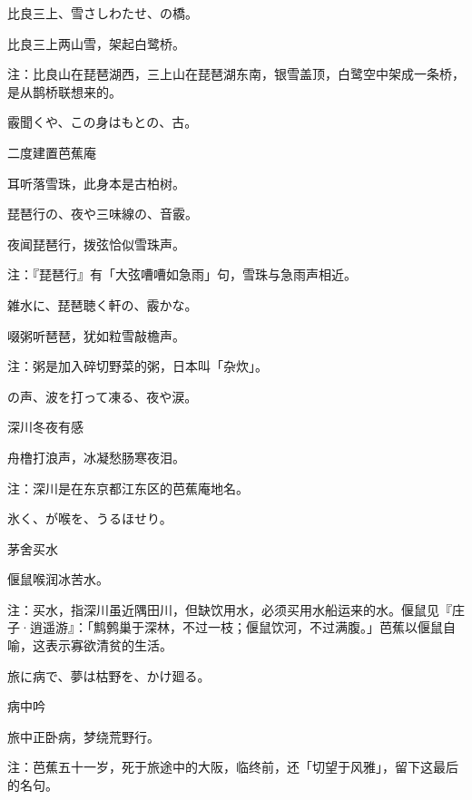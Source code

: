 \begin{haiku}
    {\FH 比良三上、雪さしわたせ、の橋。}

    {\FK 比良三上两山雪，架起白鹭桥。}

    {\FT 注：比良山在琵琶湖西，三上山在琵琶湖东南，银雪盖顶，白鹭空中架成一条桥，是从鹊桥联想来的。}
\end{haiku}

\begin{haiku}
    {\FH 霰聞くや、この身はもとの、古。}

    {\FK 二度建置芭蕉庵}

    {\FK 耳听落雪珠，此身本是古柏树。}
\end{haiku}

\begin{haiku}
    {\FH 琵琶行の、夜や三味線の、音霰。}

    {\FK 夜闻琵琶行，拨弦恰似雪珠声。}

    {\FT 注：『琵琶行』有「大弦嘈嘈如急雨」句，雪珠与急雨声相近。}
\end{haiku}

\begin{haiku}
    {\FH 雑水に、琵琶聴く軒の、霰かな。}

    {\FK 啜粥听琶琶，犹如粒雪敲檐声。}

    {\FT 注：粥是加入碎切野菜的粥，日本叫「杂炊」。}
\end{haiku}

\begin{haiku}
    {\FH {}の声、波を打って凍る、夜や涙。}

    {\FK 深川冬夜有感}

    {\FK 舟橹打浪声，冰凝愁肠寒夜泪。}

    {\FT 注：深川是在东京都江东区的芭蕉庵地名。}
\end{haiku}

\begin{haiku}
    {\FH 氷く、が喉を、うるほせり。}

    {\FK 茅舍买水}

    {\FK 偃鼠喉润冰苦水。}

    {\FT 注：买水，指深川虽近隅田川，但缺饮用水，必须买用水船运来的水。偃鼠见『庄子·逍遥游』：「鹪鹩巢于深林，不过一枝；偃鼠饮河，不过满腹。」芭蕉以偃鼠自喻，这表示寡欲清贫的生活。}
\end{haiku}

\begin{haiku}
    {\FH 旅に病で、夢は枯野を、かけ廻る。}

    {\FK 病中吟}

    {\FK 旅中正卧病，梦绕荒野行。}

    {\FT 注：芭蕉五十一岁，死于旅途中的大阪，临终前，还「切望于风雅」，留下这最后的名句。}
\end{haiku}

